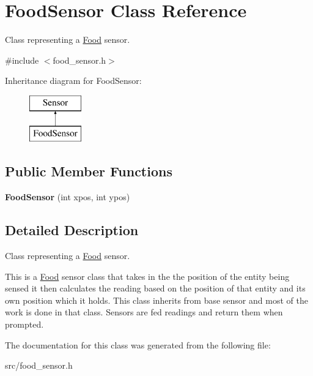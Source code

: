 \hypertarget{class_food_sensor}{}\section{Food\+Sensor Class Reference}
\label{class_food_sensor}


Class representing a \mbox{\hyperlink{class_food}{Food}} sensor.  




{\ttfamily \#include $<$food\+\_\+sensor.\+h$>$}

Inheritance diagram for Food\+Sensor\+:\begin{figure}[H]
\begin{center}
\leavevmode
\includegraphics[height=2.000000cm]{class_food_sensor}
\end{center}
\end{figure}
\subsection*{Public Member Functions}
\begin{DoxyCompactItemize}
\item 
\mbox{\label{class_food_sensor_a682d81dbb4bef2c726ef7df1b7309508}} 
{\bfseries Food\+Sensor} (int xpos, int ypos)
\end{DoxyCompactItemize}


\subsection{Detailed Description}
Class representing a \mbox{\hyperlink{class_food}{Food}} sensor. 

This is a \mbox{\hyperlink{class_food}{Food}} sensor class that takes in the the position of the entity being sensed it then calculates the reading based on the position of that entity and its own position which it holds. This class inherits from base sensor and most of the work is done in that class. Sensors are fed readings and return them when prompted. 

The documentation for this class was generated from the following file\+:\begin{DoxyCompactItemize}
\item 
src/food\+\_\+sensor.\+h\end{DoxyCompactItemize}
